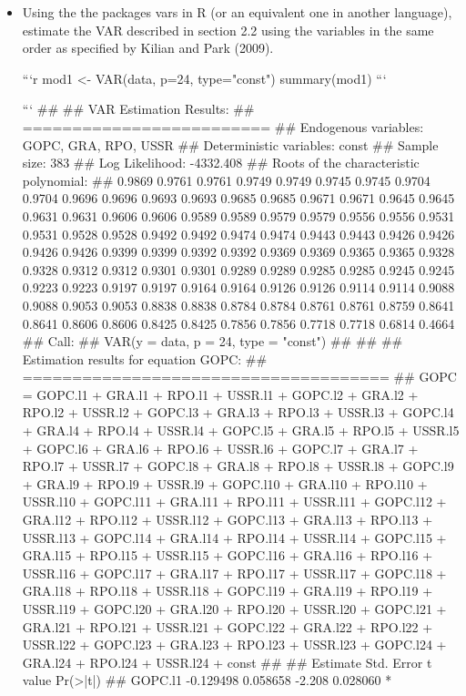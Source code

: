 \documentclass[
]{article}
\begin{document}
\begin{itemize}
\item Using the the packages vars in R (or an equivalent one in another language), estimate the VAR described in section 2.2 using the variables in the same order as specified by Kilian and Park (2009).

```r
mod1 <- VAR(data, p=24, type="const")
summary(mod1)
```

```
## 
## VAR Estimation Results:
## ========================= 
## Endogenous variables: GOPC, GRA, RPO, USSR 
## Deterministic variables: const 
## Sample size: 383 
## Log Likelihood: -4332.408 
## Roots of the characteristic polynomial:
## 0.9869 0.9761 0.9761 0.9749 0.9749 0.9745 0.9745 0.9704 0.9704 0.9696 0.9696 0.9693 0.9693 0.9685 0.9685 0.9671 0.9671 0.9645 0.9645 0.9631 0.9631 0.9606 0.9606 0.9589 0.9589 0.9579 0.9579 0.9556 0.9556 0.9531 0.9531 0.9528 0.9528 0.9492 0.9492 0.9474 0.9474 0.9443 0.9443 0.9426 0.9426 0.9426 0.9426 0.9399 0.9399 0.9392 0.9392 0.9369 0.9369 0.9365 0.9365 0.9328 0.9328 0.9312 0.9312 0.9301 0.9301 0.9289 0.9289 0.9285 0.9285 0.9245 0.9245 0.9223 0.9223 0.9197 0.9197 0.9164 0.9164 0.9126 0.9126 0.9114 0.9114 0.9088 0.9088 0.9053 0.9053 0.8838 0.8838 0.8784 0.8784 0.8761 0.8761 0.8759 0.8641 0.8641 0.8606 0.8606 0.8425 0.8425 0.7856 0.7856 0.7718 0.7718 0.6814 0.4664
## Call:
## VAR(y = data, p = 24, type = "const")
## 
## 
## Estimation results for equation GOPC: 
## ===================================== 
## GOPC = GOPC.l1 + GRA.l1 + RPO.l1 + USSR.l1 + GOPC.l2 + GRA.l2 + RPO.l2 + USSR.l2 + GOPC.l3 + GRA.l3 + RPO.l3 + USSR.l3 + GOPC.l4 + GRA.l4 + RPO.l4 + USSR.l4 + GOPC.l5 + GRA.l5 + RPO.l5 + USSR.l5 + GOPC.l6 + GRA.l6 + RPO.l6 + USSR.l6 + GOPC.l7 + GRA.l7 + RPO.l7 + USSR.l7 + GOPC.l8 + GRA.l8 + RPO.l8 + USSR.l8 + GOPC.l9 + GRA.l9 + RPO.l9 + USSR.l9 + GOPC.l10 + GRA.l10 + RPO.l10 + USSR.l10 + GOPC.l11 + GRA.l11 + RPO.l11 + USSR.l11 + GOPC.l12 + GRA.l12 + RPO.l12 + USSR.l12 + GOPC.l13 + GRA.l13 + RPO.l13 + USSR.l13 + GOPC.l14 + GRA.l14 + RPO.l14 + USSR.l14 + GOPC.l15 + GRA.l15 + RPO.l15 + USSR.l15 + GOPC.l16 + GRA.l16 + RPO.l16 + USSR.l16 + GOPC.l17 + GRA.l17 + RPO.l17 + USSR.l17 + GOPC.l18 + GRA.l18 + RPO.l18 + USSR.l18 + GOPC.l19 + GRA.l19 + RPO.l19 + USSR.l19 + GOPC.l20 + GRA.l20 + RPO.l20 + USSR.l20 + GOPC.l21 + GRA.l21 + RPO.l21 + USSR.l21 + GOPC.l22 + GRA.l22 + RPO.l22 + USSR.l22 + GOPC.l23 + GRA.l23 + RPO.l23 + USSR.l23 + GOPC.l24 + GRA.l24 + RPO.l24 + USSR.l24 + const 
## 
##           Estimate Std. Error t value Pr(>|t|)    
## GOPC.l1  -0.129498   0.058658  -2.208 0.028060 *  

\end{itemize}
\end{document}
